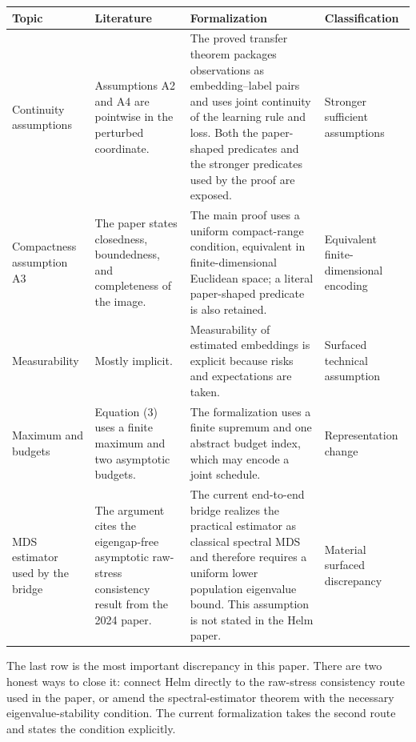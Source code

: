 \documentclass[11pt]{article}
\begin{document}
\begin{longtable}{>{\raggedright\arraybackslash}p{}
                  >{\raggedright\arraybackslash}p{}
                  >{\raggedright\arraybackslash}p{}
                  >{\raggedright\arraybackslash}p{}}
\toprule
Topic & Literature & Formalization & Classification \\
\midrule
\endhead
Continuity assumptions & Assumptions A2 and A4 are pointwise in the perturbed
coordinate. & The proved transfer theorem packages observations as
embedding--label pairs and uses joint continuity of the learning rule and loss.
Both the paper-shaped predicates and the stronger predicates used by the proof
are exposed. & Stronger sufficient assumptions \\
\addlinespace
Compactness assumption A3 & The paper states closedness, boundedness, and
completeness of the image. & The main proof uses a uniform compact-range
condition, equivalent in finite-dimensional Euclidean space; a literal
paper-shaped predicate is also retained. & Equivalent finite-dimensional
encoding \\
\addlinespace
Measurability & Mostly implicit. & Measurability of estimated embeddings is
explicit because risks and expectations are taken. & Surfaced technical
assumption \\
\addlinespace
Maximum and budgets & Equation (3) uses a finite maximum and two asymptotic
budgets. & The formalization uses a finite supremum and one abstract budget
index, which may encode a joint schedule. & Representation change \\
\addlinespace
MDS estimator used by the bridge & The argument cites the eigengap-free
asymptotic raw-stress consistency result from the 2024 paper. & The current
end-to-end bridge realizes the practical estimator as classical spectral MDS
and therefore requires a uniform lower population eigenvalue bound.  This
assumption is not stated in the Helm paper. & Material surfaced discrepancy \\
\bottomrule
\end{longtable}

The last row is the most important discrepancy in this paper.  There are two
honest ways to close it: connect Helm directly to the raw-stress consistency
route used in the paper, or amend the spectral-estimator theorem with the
necessary eigenvalue-stability condition.  The current formalization takes the
second route and states the condition explicitly.
\end{document}
